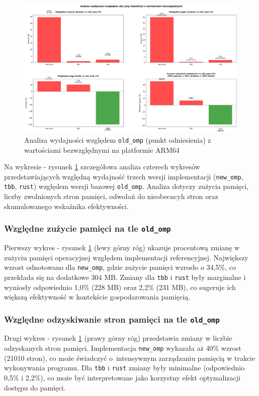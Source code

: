 \begin{figure}[H]
    \centering
    \includegraphics[width=\textwidth]{analiza/images/parallel/cg/arm/chart_05_performance_ratios.png}
    \caption{Analiza wydajności względem \texttt{old\_omp} (punkt odniesienia) z wartościami bezwzględnymi na platformie ARM64}
    \label{cg_analiza_wzgledem_old_omp}
\end{figure}
Na wykresie - rysunek \ref{cg_analiza_wzgledem_old_omp} szczegółowa analiza czterech wykresów przedstawiających względną wydajność trzech wersji implementacji (\texttt{new\_omp}, \texttt{tbb}, \texttt{rust}) względem wersji bazowej \texttt{old\_omp}. Analiza dotyczy zużycia pamięci, liczby zwolnionych stron pamięci, odwołań do nieobecncyh stron oraz skumulowanego wskaźnika efektywności.
\subsubsection{Względne zużycie pamięci na tle \texttt{old\_omp}}
Pierwszy wykres - rysunek \ref{cg_analiza_wzgledem_old_omp} (lewy górny róg) ukazuje procentową zmianę w zużyciu pamięci operacyjnej względem implementacji referencyjnej. Największy wzrost odnotowano dla \texttt{new\_omp}, gdzie zużycie pamięci wzrosło o 34,5\%, co przekłada się na dodatkowe 304 MB. Zmiany dla \texttt{tbb} i \texttt{rust} były marginalne i wyniosły odpowiednio 1,0\% (228 MB) oraz 2,2\% (231 MB), co sugeruje ich większą efektywność w kontekście gospodarowania pamięcią.

\subsubsection{Względne odzyskiwanie stron pamięci na tle \texttt{old\_omp}}
Drugi wykres - rysunek \ref{cg_analiza_wzgledem_old_omp} (prawy górny róg) przedstawia zmiany w liczbie odzyskanych stron pamięci. Implementacja \texttt{new\_omp} wykazała aż 40\% wzrost (21010 stron), co może świadczyć o~intensywnym zarządzaniu pamięcią w trakcie wykonywania programu. Dla \texttt{tbb} i \texttt{rust} zmiany były minimalne (odpowiednio 0,5\% i 2,2\%), co może być interpretowane jako korzystny efekt optymalizacji dostępu do pamięci.

